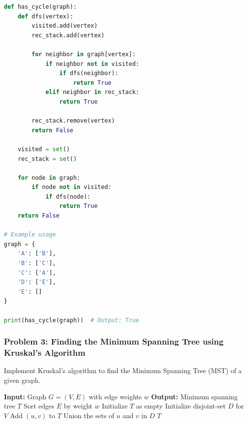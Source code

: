 \documentclass[12pt]{book} %
\begin{document}
\FloatBarrier
\begin{lstlisting}[language=Python, caption=Python implementation of Cycle Detection using DFS]
def has_cycle(graph):
    def dfs(vertex):
        visited.add(vertex)
        rec_stack.add(vertex)
        
        for neighbor in graph[vertex]:
            if neighbor not in visited:
                if dfs(neighbor):
                    return True
            elif neighbor in rec_stack:
                return True
        
        rec_stack.remove(vertex)
        return False
    
    visited = set()
    rec_stack = set()
    
    for node in graph:
        if node not in visited:
            if dfs(node):
                return True
    return False

# Example usage
graph = {
    'A': ['B'],
    'B': ['C'],
    'C': ['A'],
    'D': ['E'],
    'E': []
}

print(has_cycle(graph))  # Output: True
\end{lstlisting}
\FloatBarrier

\subsubsection*{Problem 3: Finding the Minimum Spanning Tree using Kruskal's Algorithm}
Implement Kruskal's algorithm to find the Minimum Spanning Tree (MST) of a given graph.

\begin{algorithm}
\caption{Kruskal's Algorithm}
\begin{algorithmic}[1]
\State \textbf{Input:} Graph $G=(V, E)$ with edge weights $w$
\State \textbf{Output:} Minimum spanning tree $T$
\State Sort edges $E$ by weight $w$
\State Initialize $T$ as empty
\State Initialize disjoint-set $D$ for $V$
        \State Add $(u, v)$ to $T$
        \State Union the sets of $u$ and $v$ in $D$
    \EndIf
\EndFor
\State \Return $T$
\end{algorithmic}
\end{algorithm}
\end{document}
